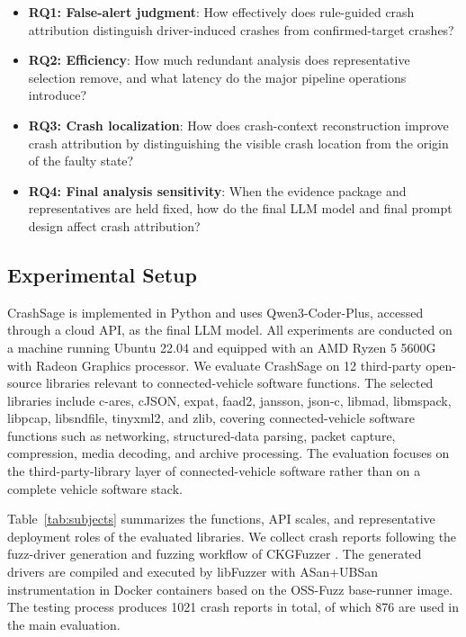 \documentclass[pdflatex,sn-basic]{sn-jnl}%
\theoremstyle{thmstyleone}%
\theoremstyle{thmstyletwo}%
\theoremstyle{thmstylethree}%
\begin{document}
\begin{itemize}
    \item \textbf{RQ1: False-alert judgment}: How effectively does rule-guided crash attribution distinguish driver-induced crashes from confirmed-target crashes?
    \item \textbf{RQ2: Efficiency}: How much redundant analysis does representative selection remove, and what latency do the major pipeline operations introduce?
    \item \textbf{RQ3: Crash localization}: How does crash-context reconstruction improve crash attribution by distinguishing the visible crash location from the origin of the faulty state?
    \item \textbf{RQ4: Final analysis sensitivity}: When the evidence package and representatives are held fixed, how do the final LLM model and final prompt design affect crash attribution?
\end{itemize}

\subsection{Experimental Setup}

CrashSage is implemented in Python and uses Qwen3-Coder-Plus, accessed through a cloud API, as the final LLM model. All experiments are conducted on a machine running Ubuntu 22.04 and equipped with an AMD Ryzen 5 5600G with Radeon Graphics processor. We evaluate CrashSage on 12 third-party open-source libraries relevant to connected-vehicle software functions. The selected libraries include c-ares, cJSON, expat, faad2, jansson, json-c, libmad, libmspack, libpcap, libsndfile, tinyxml2, and zlib, covering connected-vehicle software functions such as networking, structured-data parsing, packet capture, compression, media decoding, and archive processing. The evaluation focuses on the third-party-library layer of connected-vehicle software rather than on a complete vehicle software stack.

Table~\ref{tab:subjects} summarizes the functions, API scales, and representative deployment roles of the evaluated libraries. We collect crash reports following the fuzz-driver generation and fuzzing workflow of CKGFuzzer \citep{ref12}. The generated drivers are compiled and executed by libFuzzer with ASan+UBSan instrumentation in Docker containers based on the OSS-Fuzz base-runner image. The testing process produces 1021 crash reports in total, of which 876 are used in the main evaluation.
\end{document}
